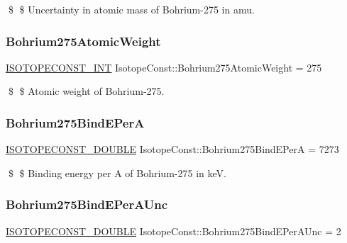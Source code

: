 \$ \$ Uncertainty in atomic mass of Bohrium-\/275 in amu. \mbox{\label{group___isotope_const-_bohrium-_bh275_gacf6603a3ca0844d4d1a4f71946a6395e}} 
\subsubsection{\texorpdfstring{Bohrium275\+Atomic\+Weight}{Bohrium275AtomicWeight}}
{\footnotesize\ttfamily \mbox{\hyperlink{group___isotope_const-_macros_ga5f18360b3e99483a35c32d789e62621c}{I\+S\+O\+T\+O\+P\+E\+C\+O\+N\+S\+T\+\_\+\+I\+NT}} Isotope\+Const\+::\+Bohrium275\+Atomic\+Weight = 275}

\$ \$ Atomic weight of Bohrium-\/275. \mbox{\label{group___isotope_const-_bohrium-_bh275_ga1a47843812d90dd28df704c1ef9ef354}} 
\subsubsection{\texorpdfstring{Bohrium275\+Bind\+E\+PerA}{Bohrium275BindEPerA}}
{\footnotesize\ttfamily \mbox{\hyperlink{group___isotope_const-_macros_ga8f45a7272ce02c0b4c65c44636ed719a}{I\+S\+O\+T\+O\+P\+E\+C\+O\+N\+S\+T\+\_\+\+D\+O\+U\+B\+LE}} Isotope\+Const\+::\+Bohrium275\+Bind\+E\+PerA = 7273}

\$ \$ Binding energy per A of Bohrium-\/275 in keV. \mbox{\label{group___isotope_const-_bohrium-_bh275_ga22f01fce58184c03201ce4c2788d1806}} 
\subsubsection{\texorpdfstring{Bohrium275\+Bind\+E\+Per\+A\+Unc}{Bohrium275BindEPerAUnc}}
{\footnotesize\ttfamily \mbox{\hyperlink{group___isotope_const-_macros_ga8f45a7272ce02c0b4c65c44636ed719a}{I\+S\+O\+T\+O\+P\+E\+C\+O\+N\+S\+T\+\_\+\+D\+O\+U\+B\+LE}} Isotope\+Const\+::\+Bohrium275\+Bind\+E\+Per\+A\+Unc = 2}

